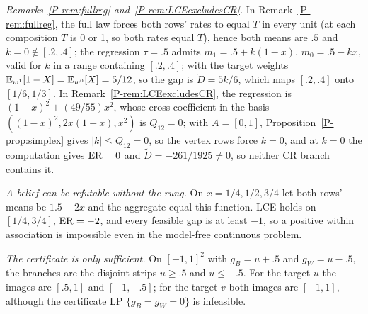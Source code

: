 \emph{Remarks~\ref{P-rem:fullreg} and~\ref{P-rem:LCEexcludesCR}.} In
Remark~\ref{P-rem:fullreg}, the full law forces both rows' rates to equal $T$ in every
unit (at each composition $T$ is 0 or 1, so both rates equal $T$), hence both means are
$.5$ and $k=0\notin[.2,.4]$; the regression $\tau=.5$ admits $m_1=.5+k(1-x)$,
$m_0=.5-kx$, valid for $k$ in a range containing $[.2,.4]$; with the target weights
$\mathbb E_{w^1}[1-X]=\mathbb E_{w^0}[X]=5/12$, so the gap is $\tilde D=5k/6$, which maps $[.2,.4]$
onto $[1/6,1/3]$. In Remark~\ref{P-rem:LCEexcludesCR}, the regression is
$(1-x)^2+(49/55)x^2$, whose cross coefficient in the basis
$((1-x)^2,2x(1-x),x^2)$ is $Q_{12}=0$; with $A=[0,1]$, Proposition~\ref{P-prop:simplex}
gives $|k|\le Q_{12}=0$, so the vertex rows force $k=0$, and
at $k=0$ the computation gives $\mathrm{ER}=0$ and $\tilde D=-261/1925\ne0$, so neither CR branch
contains it.

\emph{A belief can be refutable without the rung.} On $x=1/4,1/2,3/4$ let both rows'
means be $1.5-2x$ and the aggregate equal this function. LCE holds on $[1/4,3/4]$,
$\mathrm{ER}=-2$, and every feasible gap is at least $-1$, so a positive within association is
impossible even in the model-free continuous problem.

\emph{The certificate is only sufficient.} On $[-1,1]^2$ with $g_B=u+.5$ and
$g_W=u-.5$, the branches are the disjoint strips $u\ge.5$ and $u\le-.5$. For the target
$u$ the images are $[.5,1]$ and $[-1,-.5]$; for the target $v$ both images are $[-1,1]$,
although the certificate LP $\{g_B=g_W=0\}$ is infeasible.

